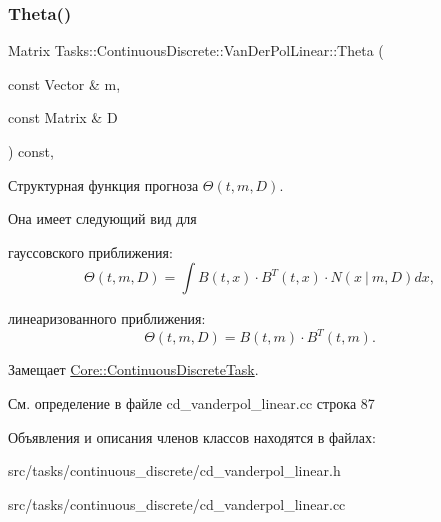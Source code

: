 \subsubsection{\texorpdfstring{Theta()}{Theta()}}
{\footnotesize\ttfamily Matrix Tasks\+::\+Continuous\+Discrete\+::\+Van\+Der\+Pol\+Linear\+::\+Theta (\begin{DoxyParamCaption}\item[{const Vector \&}]{m,  }\item[{const Matrix \&}]{D }\end{DoxyParamCaption}) const\hspace{0.3cm}{\ttfamily [override]}, {\ttfamily [virtual]}}



Структурная функция прогноза $\Theta(t,m,D)$. 

Она имеет следующий вид для


\begin{DoxyItemize}
\item гауссовского приближения\+: \[\Theta(t,m,D) = \int B(t,x)\cdot B^T(t,x)\cdot N(x\ |\ m,D)dx,\]
\item линеаризованного приближения\+: \[\Theta(t,m,D) = B(t,m)\cdot B^T(t,m).\] 
\end{DoxyItemize}

Замещает \hyperlink{class_core_1_1_continuous_discrete_task_a961cc49fd0c72ba0a211bb4913ca3ece}{Core\+::\+Continuous\+Discrete\+Task}.



См. определение в файле cd\+\_\+vanderpol\+\_\+linear.\+cc строка 87



Объявления и описания членов классов находятся в файлах\+:\begin{DoxyCompactItemize}
\item 
src/tasks/continuous\+\_\+discrete/cd\+\_\+vanderpol\+\_\+linear.\+h\item 
src/tasks/continuous\+\_\+discrete/cd\+\_\+vanderpol\+\_\+linear.\+cc\end{DoxyCompactItemize}
